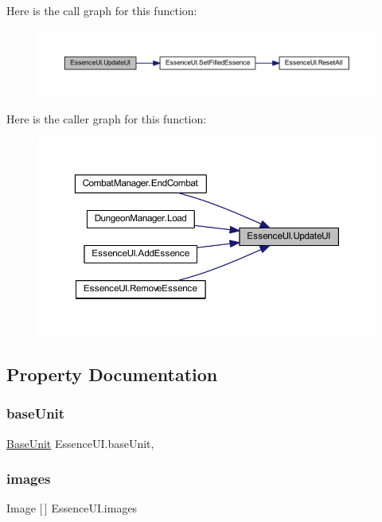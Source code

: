 Here is the call graph for this function\+:\nopagebreak
\begin{figure}[H]
\begin{center}
\leavevmode
\includegraphics[width=350pt]{class_essence_u_i_a26023c3d4977188014384a1a40eb3ad9_cgraph}
\end{center}
\end{figure}
Here is the caller graph for this function\+:\nopagebreak
\begin{figure}[H]
\begin{center}
\leavevmode
\includegraphics[width=350pt]{class_essence_u_i_a26023c3d4977188014384a1a40eb3ad9_icgraph}
\end{center}
\end{figure}


\subsection{Property Documentation}
\mbox{\label{class_essence_u_i_aa0f4e2e07a1b90d6656dbbbf34a459fe}} 
\subsubsection{\texorpdfstring{baseUnit}{baseUnit}}
{\footnotesize\ttfamily \mbox{\hyperlink{class_base_unit}{Base\+Unit}} Essence\+U\+I.\+base\+Unit\hspace{0.3cm}{\ttfamily [get]}, {\ttfamily [set]}}

\mbox{\label{class_essence_u_i_a08b6afcc69283f73676b25f7d3faea16}} 
\subsubsection{\texorpdfstring{images}{images}}
{\footnotesize\ttfamily Image \mbox{[}$\,$\mbox{]} Essence\+U\+I.\+images\hspace{0.3cm}{\ttfamily [get]}}

